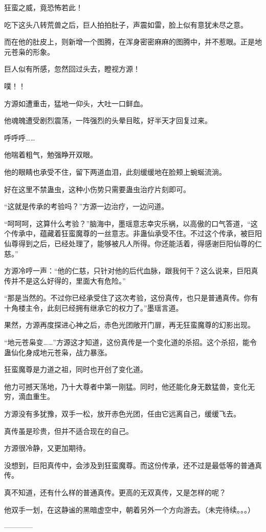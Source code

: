 \begin{this_body}
狂蛮之威，竟恐怖若此！

吃下这头八转荒兽之后，巨人拍拍肚子，声震如雷，脸上似有意犹未尽之意。

而在他的肚皮上，则新增一个图腾，在浑身密密麻麻的图腾中，并不惹眼。正是地元苍枭的形象。

巨人似有所感，忽然回过头去，瞪视方源！

噗！！

方源如遭重击，猛地一仰头，大吐一口鲜血。

他魂魄遭受剧烈震荡，一阵强烈的头晕目眩，好半天才回复过来。

呼呼呼……

他喘着粗气，勉强睁开双眼。

他的眼睛也承受不住，留下两道血泪，此刻缓缓地在脸颊上蜿蜒流淌。

好在这里不禁蛊虫，这种小伤势只需要蛊虫治疗片刻即可。

“这就是传承的考验吗？”方源一边治疗，一边问道。

“呵呵呵，这算什么考验？”脑海中，墨瑶意志幸灾乐祸，以高傲的口气答道，“这个传承中，蕴藏着狂蛮魔尊的一丝意志。非蛊仙承受不住。不过这个传承，被巨阳仙尊得到之后，已经处理了，能够被凡人所得。你还能活着，得感谢巨阳仙尊的仁慈。”

方源冷哼一声：“他的仁慈，只针对他的后代血脉，跟我何干？这么说来，巨阳真传并不是这么好得的，里面大有危险。”

“那是当然的。不过你已经承受住了这次考验，这份真传，也只是普通真传。你有十角楼主令，此刻已经拥有继承它的权力了。”墨瑶言道。

果然，方源再度探进心神之后，赤色光团敞开门扉，再无狂蛮魔尊的幻影出现。

“地元苍枭变……”方源这才知道，这份真传是一个变化道的杀招。这个杀招，能令蛊仙化身成地元苍枭，战力暴涨。

狂蛮魔尊是力道之祖，同时也开创了变化道。

他力可撼天荡地，乃十大尊者中第一刚猛。同时，他还能化身无数猛兽，变化无穷，滴血重生。

方源没有多犹豫，双手一松，放开赤色光团，任由它远离自己，缓缓飞去。

真传虽是珍贵，但并不适合现在的自己。

方源很冷静，又更加期待。

没想到，巨阳真传中，会涉及到狂蛮魔尊。而这份传承，还不过是最低等的普通真传。

真不知道，还有什么样的普通真传。更高的无双真传，又是怎样的呢？

他双手一划，在这静谧的黑暗虚空中，朝着另外一个方向游去。（未完待续。。。）

------------

\end{this_body}

